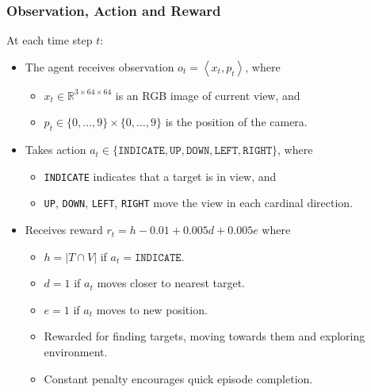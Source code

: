 \begin{frame}
    \frametitle{Observation, Action and Reward}

    At each time step \(t\):

    \begin{itemize}
        \item The agent receives observation \(o_t = \left\langle x_t, p_t \right\rangle\), where
        \begin{itemize}
            \item \(x_t \in \mathbb{R}^{3 \times 64 \times 64}\) is an RGB image of current view, and
            \item \(p_t \in \{0, \dots, 9\} \times \{0, \dots, 9\}\) is the position of the camera.
        \end{itemize}
        \item Takes action \(a_t \in \{\texttt{INDICATE}, \texttt{UP}, \texttt{DOWN}, \texttt{LEFT}, \texttt{RIGHT}\}\), where
        \begin{itemize}
            \item \texttt{INDICATE} indicates that a target is in view, and
            \item \texttt{UP}, \texttt{DOWN}, \texttt{LEFT}, \texttt{RIGHT} move the view in each cardinal direction.
        \end{itemize}
        \item Receives reward \(r_t = h - 0.01 + 0.005d + 0.005e\) where
        \begin{itemize}
            \item \(h = \left\vert T \cap V \right\vert\) if \(a_t = \texttt{INDICATE}\).
            \item \(d = 1\) if \(a_t\) moves closer to nearest target.
            \item \(e = 1\) if \(a_t\) moves to new position.
            \item Rewarded for finding targets, moving towards them and exploring environment.
            \item Constant penalty encourages quick episode completion.
        \end{itemize}
    \end{itemize}
\end{frame}


